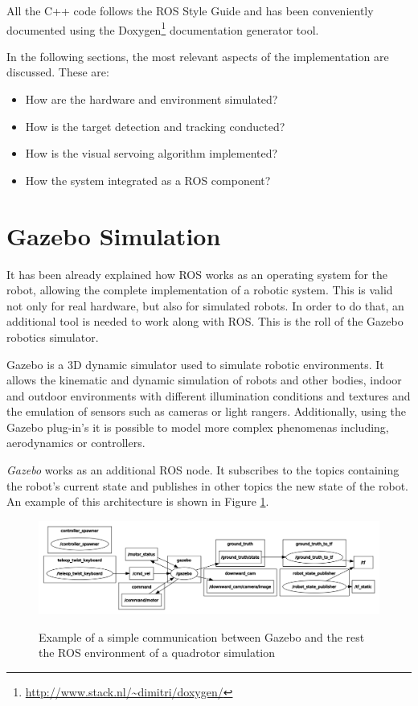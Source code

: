 All the C++ code follows the ROS Style Guide\cite{ROS_Style} and has been conveniently documented using the Doxygen\footnote{\url{http://www.stack.nl/~dimitri/doxygen/}} documentation generator tool.

In the following sections, the most relevant aspects of the implementation are discussed. These are: 

\begin{itemize}
	\item How are the hardware and environment simulated?
	
	\item How is the target detection and tracking conducted?
	
	\item How is the visual servoing algorithm implemented?
	
	\item How the system integrated as a ROS component?
\end{itemize}


\section{Gazebo Simulation}
\label{sec:gazebo-simulation}

It has been already explained how ROS works as an operating system for the robot, allowing the complete implementation of a robotic system. This is valid not only for real hardware, but also for simulated robots. In order to do that, an additional tool is needed to work along with ROS. This is the roll of the Gazebo robotics simulator.

Gazebo is a 3D dynamic simulator used to simulate robotic environments. It allows the kinematic and dynamic simulation of robots and other bodies, indoor and outdoor environments with different illumination conditions and textures and the emulation of sensors such as cameras or light rangers. Additionally, using the Gazebo plug-in's it is possible to model more complex phenomenas including, aerodynamics or controllers.

\emph{Gazebo} works as an additional ROS node. It subscribes to the topics containing the robot's current state and publishes in other topics the new state of the robot. An example of this architecture is shown in Figure \ref{fig:gazebo_example}.

\begin{figure}[!htb]
	\caption{Example of a simple communication between Gazebo and the rest the ROS environment of a quadrotor simulation}
	\centering
	\includegraphics[width=\textwidth]{content/chapter_05/images/gazebo_example.png}
	\label{fig:gazebo_example}
\end{figure}

